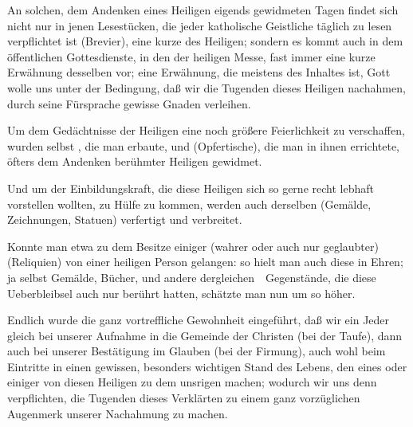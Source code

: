 \begin{aufza}
\item An solchen, dem Andenken eines Heiligen eigends gewidmeten Tagen findet sich nicht nur in jenen Lesestücken, die jeder katholische Geistliche täglich zu lesen verpflichtet ist (Brevier), eine kurze  des Heiligen; sondern es kommt auch in dem öffentlichen Gottesdienste, in den  der heiligen Messe, fast immer eine kurze Erwähnung desselben vor; eine Erwähnung, die meistens des Inhaltes ist, Gott wolle uns unter der Bedingung, daß wir die Tugenden dieses Heiligen nachahmen, durch seine Fürsprache gewisse Gnaden verleihen.
\item Um dem Gedächtnisse der Heiligen eine noch größere Feierlichkeit zu verschaffen, wurden selbst , die man erbaute, und  (Opfertische), die man in ihnen errichtete, öfters dem Andenken berühmter Heiligen gewidmet.
\item Und um der Einbildungskraft, die diese Heiligen sich so gerne recht lebhaft vorstellen wollten, zu Hülfe zu kommen, werden auch  derselben (Gemälde, Zeichnungen, Statuen) verfertigt und verbreitet.
\item Konnte man etwa zu dem Besitze einiger (wahrer oder auch nur geglaubter)  (Reliquien) von einer heiligen Person gelangen: so hielt man auch diese in Ehren; ja selbst Gemälde, Bücher, und andere dergleichen~\ Gegenstände, die diese Ueberbleibsel auch nur berührt hatten, schätzte man nun um so höher.
\item Endlich wurde die ganz vortreffliche Gewohnheit eingeführt, daß wir ein Jeder gleich bei unserer Aufnahme in die Gemeinde der Christen (bei der Taufe), dann auch bei unserer Bestätigung im Glauben (bei der Firmung), auch wohl beim Eintritte in einen gewissen, besonders wichtigen Stand des Lebens, den  eines oder einiger von diesen Heiligen zu dem unsrigen machen; wodurch wir uns denn verpflichten, die Tugenden dieses Verklärten zu einem ganz vorzüglichen Augenmerk unserer Nachahmung zu machen.
\end{aufza}
